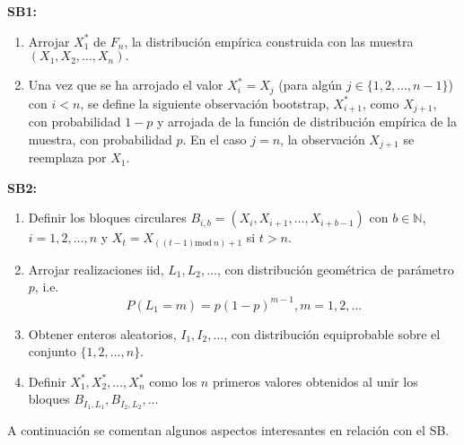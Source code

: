 \documentclass[
]{book}
\theoremstyle{definition}
\theoremstyle{definition}
\theoremstyle{definition}
\theoremstyle{remark}
\begin{document}
\textbf{SB1:}

\begin{enumerate}
\def\labelenumi{\arabic{enumi}.}
\item
  Arrojar \(X_1^{\ast}\) de \(F_n\), la distribución empírica
  construida con las muestra \((X_1,X_2,\ldots ,X_n).\)
\item
  Una vez que se ha arrojado el valor \(X_i^{\ast}=X_j\) (para
  algún \(j\in \{1,2,\ldots ,n-1\}\)) con \(i<n\), se define la siguiente
  observación bootstrap, \(X_{i+1}^{\ast}\), como \(X_{j+1}\), con
  probabilidad \(1-p\) y arrojada de la función de distribución empírica
  de la muestra, con probabilidad \(p\). En el caso \(j=n\), la
  observación \(X_{j+1}\) se reemplaza por \(X_1\).
\end{enumerate}

\textbf{SB2:}

\begin{enumerate}
\def\labelenumi{\arabic{enumi}.}
\item
  Definir los bloques circulares \(B_{i,b}=(X_i,X_{i+1},\ldots ,X_{i+b-1})\) con \(b\in \mathbb{N}\), \(i=1,2,\ldots ,n\) y
  \(X_{t}=X_{\left(\left( t-1 \right) \mathrm{mod\ }n \right) +1}\) si \(t>n\).
\item
  Arrojar realizaciones iid, \(L_1,L_2,\ldots\), con distribución
  geométrica de parámetro \(p\), i.e.
  \[P(L_1=m)=p(1-p)^{m-1},m=1,2,\ldots\]
\item
  Obtener enteros aleatorios, \(I_1,I_2,\ldots\), con distribución
  equiprobable sobre el conjunto \(\{1,2,\ldots ,n\}\).
\item
  Definir \(X_1^{\ast},X_2^{\ast},\ldots ,X_n^{\ast}\) como los
  \(n\) primeros valores obtenidos al unir los bloques
  \(B_{I_1,L_1},B_{I_2,L_2},\ldots\)
\end{enumerate}

A continuación se comentan algunos aspectos interesantes en relación con
el SB.
\end{document}
